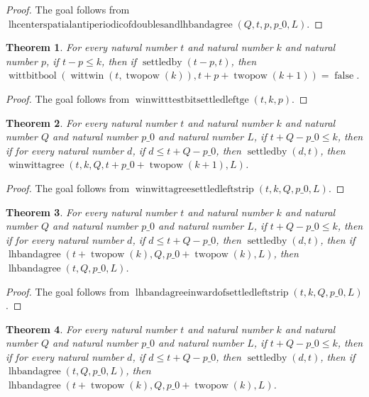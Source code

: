 \documentclass[11pt]{article}
\newtheorem{theorem}{Theorem}[section]
\theoremstyle{definition}
\begin{document}
\begin{proof}
The goal follows from \(\operatorname{lhcenterspatialantiperiodicofdoublesandlhbandagree}(Q, t, p, p\_0, L)\).
\end{proof}
\begin{theorem}
\label{ll:paper:winwitt-testbit-settled-left-ge}
For every natural number \(t\) and natural number \(k\) and natural number \(p\), if \(t - p \le k\), then if \(\operatorname{settledby}(t - p, t)\), then \(\operatorname{wittbitbool}(\operatorname{wittwin}(t, \operatorname{twopow}(k)), t + p + \operatorname{twopow}(k + 1)) = \operatorname{false}\).
\end{theorem}
\begin{proof}
The goal follows from \(\operatorname{winwitttestbitsettledleftge}(t, k, p)\).
\end{proof}
\begin{theorem}
\label{ll:paper:winwittagree-settled-left-strip}
For every natural number \(t\) and natural number \(k\) and natural number \(Q\) and natural number \(p\_0\) and natural number \(L\), if \(t + Q - p\_0 \le k\), then if for every natural number \(d\), if \(d \le t + Q - p\_0\), then \(\operatorname{settledby}(d, t)\), then \(\operatorname{winwittagree}(t, k, Q, t + p\_0 + \operatorname{twopow}(k + 1), L)\).
\end{theorem}
\begin{proof}
The goal follows from \(\operatorname{winwittagreesettledleftstrip}(t, k, Q, p\_0, L)\).
\end{proof}
\begin{theorem}
\label{ll:paper:lhbandagree-inward-of-settled-left-strip}
For every natural number \(t\) and natural number \(k\) and natural number \(Q\) and natural number \(p\_0\) and natural number \(L\), if \(t + Q - p\_0 \le k\), then if for every natural number \(d\), if \(d \le t + Q - p\_0\), then \(\operatorname{settledby}(d, t)\), then if \(\operatorname{lhbandagree}(t + \operatorname{twopow}(k), Q, p\_0 + \operatorname{twopow}(k), L)\), then \(\operatorname{lhbandagree}(t, Q, p\_0, L)\).
\end{theorem}
\begin{proof}
The goal follows from \(\operatorname{lhbandagreeinwardofsettledleftstrip}(t, k, Q, p\_0, L)\).
\end{proof}
\begin{theorem}
\label{ll:paper:lhbandagree-step-of-settled-left-strip}
For every natural number \(t\) and natural number \(k\) and natural number \(Q\) and natural number \(p\_0\) and natural number \(L\), if \(t + Q - p\_0 \le k\), then if for every natural number \(d\), if \(d \le t + Q - p\_0\), then \(\operatorname{settledby}(d, t)\), then if \(\operatorname{lhbandagree}(t, Q, p\_0, L)\), then \(\operatorname{lhbandagree}(t + \operatorname{twopow}(k), Q, p\_0 + \operatorname{twopow}(k), L)\).
\end{theorem}
\end{document}

